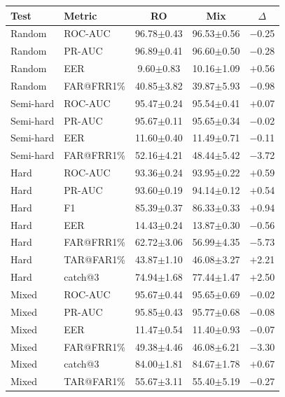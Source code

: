 \documentclass[11pt]{article}
\begin{document}
\begin{table}[!t]
\centering
\scriptsize
\begin{minipage}[t]{0.48\textwidth}
\centering
\begin{tabular}{l l c c c}
\toprule
\textbf{Test} & \textbf{Metric} & \textbf{RO} & \textbf{Mix} & \textbf{$\Delta$} \\
\midrule
Random    & ROC-AUC    & 96.78$\pm$0.43 & 96.53$\pm$0.56 & $-$0.25 \\
Random    & PR-AUC     & 96.89$\pm$0.41 & 96.60$\pm$0.50 & $-$0.28 \\
Random    & EER        & \phantom{0}9.60$\pm$0.83 & 10.16$\pm$1.09 & $+$0.56 \\
Random    & FAR@FRR1\% & 40.85$\pm$3.82 & 39.87$\pm$5.93 & $-$0.98 \\
\midrule
Semi-hard & ROC-AUC    & 95.47$\pm$0.24 & 95.54$\pm$0.41 & $+$0.07 \\
Semi-hard & PR-AUC     & 95.67$\pm$0.11 & 95.65$\pm$0.34 & $-$0.02 \\
Semi-hard & EER        & 11.60$\pm$0.40 & 11.49$\pm$0.71 & $-$0.11 \\
Semi-hard & FAR@FRR1\% & 52.16$\pm$4.21 & 48.44$\pm$5.42 & $-$3.72 \\
\midrule
Hard      & ROC-AUC    & 93.36$\pm$0.24 & 93.95$\pm$0.22 & $+$0.59 \\
Hard      & PR-AUC     & 93.60$\pm$0.19 & 94.14$\pm$0.12 & $+$0.54 \\
Hard      & F1         & 85.39$\pm$0.37 & 86.33$\pm$0.33 & $+$0.94 \\
Hard      & EER        & 14.43$\pm$0.24 & 13.87$\pm$0.30 & $-$0.56 \\
Hard      & FAR@FRR1\% & 62.72$\pm$3.06 & 56.99$\pm$4.35 & $-$5.73 \\
Hard      & TAR@FAR1\% & 43.87$\pm$1.10 & 46.08$\pm$3.27 & $+$2.21 \\
Hard      & catch@3    & 74.94$\pm$1.68 & 77.44$\pm$1.47 & $+$2.50 \\
\midrule
Mixed     & ROC-AUC    & 95.67$\pm$0.44 & 95.65$\pm$0.69 & $-$0.02 \\
Mixed     & PR-AUC     & 95.85$\pm$0.43 & 95.77$\pm$0.68 & $-$0.08 \\
Mixed     & EER        & 11.47$\pm$0.54 & 11.40$\pm$0.93 & $-$0.07 \\
Mixed     & FAR@FRR1\% & 49.38$\pm$4.46 & 46.08$\pm$6.21 & $-$3.30 \\
Mixed     & catch@3    & 84.00$\pm$1.81 & 84.67$\pm$1.78 & $+$0.67 \\
Mixed     & TAR@FAR1\% & 55.67$\pm$3.11 & 55.40$\pm$5.19 & $-$0.27 \\
\bottomrule
\end{tabular}
\label{tab:app_pan_distilbert}
\end{minipage}%
\hfill
\begin{minipage}[t]{0.48\textwidth}
\centering


\end{minipage}
\end{table}
\end{document}
